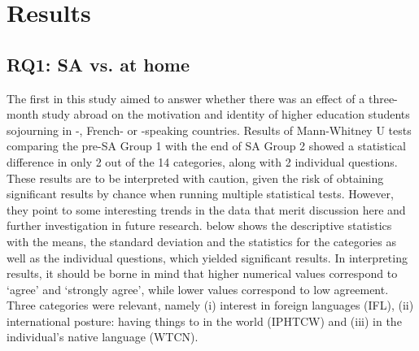 \documentclass[output=paper]{langsci/langscibook}
\begin{document}
\section{Results}


\subsection{RQ1: SA vs. at home}


The first  in this study aimed to answer whether there was an effect of a three-month study abroad on the motivation and identity of higher education students sojourning in -, French- or -speaking countries. Results of Mann-Whitney U tests comparing the pre-SA Group 1 with the end of SA Group 2 showed a statistical difference in only 2 out of the 14 categories, along with 2 individual questions. These results are to be interpreted with caution, given the risk of obtaining significant results by chance when running multiple statistical tests. However, they point to some interesting trends in the data that merit discussion here and further investigation in future research.  below shows the descriptive statistics with the means, the standard deviation and the statistics for the categories as well as the individual questions, which yielded significant results. In interpreting results, it should be borne in mind that higher numerical values correspond to ‘agree’ and ‘strongly agree’, while lower values correspond to low agreement. Three categories were relevant, namely (i) interest in foreign languages (IFL), (ii) international posture: having things to  in the world (IPHTCW) and (iii)  in the individual’s native language (WTCN). 
\end{document}
